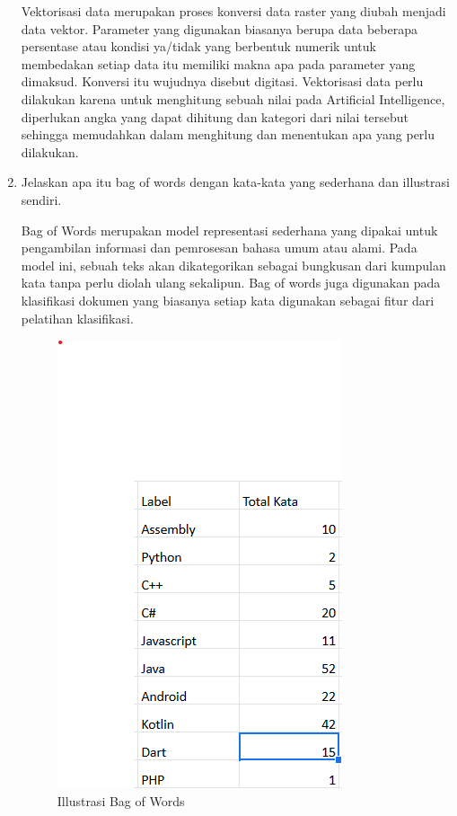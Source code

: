 \begin{enumerate}
    Vektorisasi data merupakan proses konversi data raster yang diubah menjadi data vektor. Parameter yang digunakan biasanya berupa data beberapa persentase atau kondisi ya/tidak yang berbentuk numerik untuk membedakan setiap data itu memiliki makna apa pada parameter yang dimaksud. Konversi itu wujudnya disebut digitasi. Vektorisasi data perlu dilakukan karena untuk menghitung sebuah nilai pada Artificial Intelligence, diperlukan angka yang dapat dihitung dan kategori dari nilai tersebut sehingga memudahkan dalam menghitung dan menentukan apa yang perlu dilakukan.
    \item Jelaskan apa itu bag of words dengan kata-kata yang sederhana dan illustrasi sendiri. \par
    Bag of Words merupakan model representasi sederhana yang dipakai untuk pengambilan informasi dan pemrosesan bahasa umum atau alami. Pada model ini, sebuah teks akan dikategorikan sebagai bungkusan dari kumpulan kata tanpa perlu diolah ulang sekalipun. Bag of words juga digunakan pada klasifikasi dokumen yang biasanya setiap kata digunakan sebagai fitur dari pelatihan klasifikasi. 
    \begin{figure}[ht]
        \centering
        \includegraphics[scale=0.2]{figures/1174035/chapter4/5_teori.png}
        \caption{Illustrasi Bag of Words}
        \label{contoh4}
    \end{figure}

\end{enumerate}

